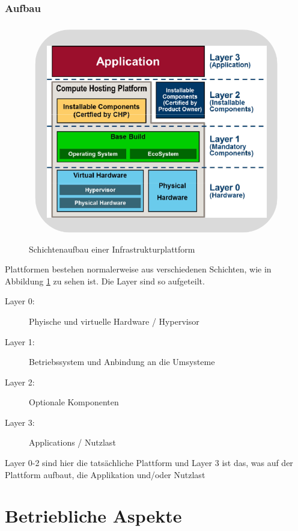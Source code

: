 \documentclass[a4paper, 11pt]{article}
\begin{document}
\subsubsection{Aufbau}
\begin{figure}
	\centering
	\includegraphics[keepaspectratio=true,height=15\baselineskip]{infrastruktur_schichten.PNG}
	\caption{Schichtenaufbau einer Infrastrukturplattform}
	\label{fig:infStruk}
\end{figure}
Plattformen bestehen normalerweise aus verschiedenen Schichten, wie in Abbildung \ref{fig:infStruk} zu sehen ist. Die Layer sind so aufgeteilt.

\begin{description}
	\item[Layer 0: ] Phyische und virtuelle Hardware / Hypervisor
	\item[Layer 1: ] Betriebssystem und Anbindung an die Umsysteme
	\item[Layer 2: ] Optionale Komponenten
	\item[Layer 3: ] Applications / Nutzlast
\end{description}
\vspace{10px}

\noindent Layer 0-2 sind hier die tatsächliche Plattform und Layer 3 ist das, was auf der Plattform aufbaut, die Applikation und/oder Nutzlast

\section{Betriebliche Aspekte}
\end{document}
